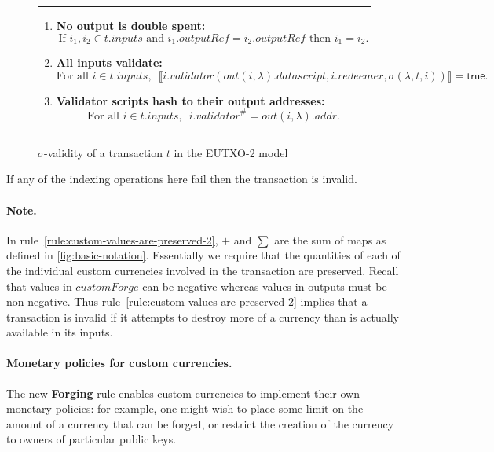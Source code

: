 \documentclass[a4paper]{article}
\theoremstyle{definition}  %
\newcommand\rfskip{7pt}
\newenvironment{ruledfigure}[1]{\begin{figure}[#1]\hrule\vspace{\rfskip}}{\vspace{\rfskip}\hrule\end{figure}}
\newcommand{\true}{\textsf{true}}
\newcommand{\mi}[1]{\ensuremath{\mathit{#1}}}
\newcommand{\inputs}{\mi{inputs}}
\newcommand{\addr}{\mi{addr}}
\newcommand{\customforge}{\mi{customForge}}
\newcommand{\validator}{\mi{validator}}
\newcommand{\redeemer}{\mi{redeemer}}
\newcommand{\datascript}{\mi{datascript}}
\newcommand{\txout}{\mi{out}}
\begin{document}
\begin{ruledfigure}{H}
\begin{enumerate}
\begin{minipage}{0.85\textwidth}
          \end{minipage}
    \item \label{rule:no-double-spending-2} \textbf{No output is double spent:}
    \[
     \textrm{If } i_1, i_2 \in t.\inputs \textrm{ and }  i_1.\mathit{outputRef} = i_2.\mathit{outputRef}
     \textrm{ then } i_1 = i_2.
    \]
    \item\label{rule:all-inputs-validate-2} \textbf{All inputs validate:}
    \[
    \textrm{For all } i \in t.\inputs,\enspace \llbracket
    i.\validator(\txout(i,
    \lambda).\datascript,i.\redeemer, \sigma(\lambda, t, i))
    \rrbracket = \true.
      \]
    \item\label{rule:validator-scripts-hash-2} \textbf{Validator scripts hash to their output addresses:}
    \[
      \textrm{For all } i \in t.\inputs,\enspace i.\validator^{\#} = \txout(i, \lambda).\addr.
    \]
  \end{enumerate}
  \caption{$\sigma$-validity of a transaction $t$ in the EUTXO-2 model}
  \label{fig:eutxo-2-validity}

\end{ruledfigure}

\noindent If any of the indexing operations here fail then the
transaction is invalid.

\paragraph{Note.} In rule~\cref{rule:custom-values-are-preserved-2}, $+$ and $\sum$ are the
sum of maps as defined in \cref{fig:basic-notation}. Essentially
we require that the quantities of each of the individual custom currencies
involved in the transaction are preserved.  Recall that values in
$\customforge$ can be negative whereas values in outputs must
be non-negative.  Thus rule~\cref{rule:custom-values-are-preserved-2} implies
that a transaction is invalid if it attempts to destroy more of a currency
than is actually available in its inputs.


\paragraph{Monetary policies for custom currencies.}
The new \textbf{Forging}
rule enables custom currencies to implement their own monetary
policies: for example, one might wish to place some limit on the
amount of a currency that can be forged, or restrict the creation of
the currency to owners of particular public keys.
\end{document}
